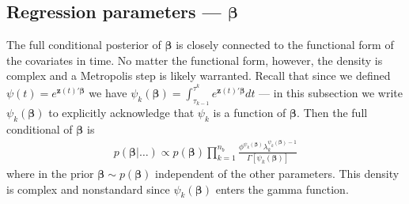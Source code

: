 \documentclass{article}
\begin{document}
\subsection{Regression parameters --- $\bm{\beta}$}
The full conditional posterior of $\bm{\beta}$ is closely connected to the functional form of the covariates in time. No matter the functional form, however, the density is complex and a Metropolis step is likely warranted. Recall that since we defined $\psi(t) = e^{\bm{z}(t)'\bm{\beta}}$ we have $\psi_k(\bm{\beta}) = \int_{\tau_{k-1}}^{\tau^k}e^{\bm{z}(t)'\bm{\beta}}dt$ --- in this subsection we write $\psi_k(\bm{\beta})$ to explicitly acknowledge that $\psi_k$ is a function of $\bm{\beta}$. Then the full conditional of $\bm{\beta}$ is
\begin{align*}
p(\bm{\beta}|\dots) \propto p(\bm{\beta})\prod_{k=1}^{n_b}\frac{\phi^{\psi_k(\bm{\beta})}\lambda_k^{\psi_k(\bm{\beta}) - 1}}{\Gamma[\psi_k(\bm{\beta})]}
\end{align*}
where in the prior $\bm{\beta} \sim p(\bm{\beta})$ independent of the other parameters. This density is complex and nonstandard since $\psi_k(\bm{\beta})$ enters the gamma function.
\end{document}
